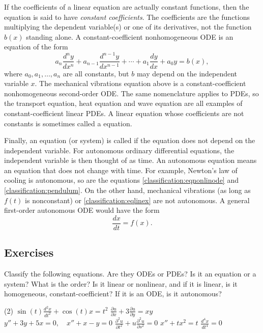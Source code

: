\medskip

If the coefficients of a linear equation are actually constant functions,
then the equation is said to have
\emph{constant coefficients}.
The coefficients are the functions multiplying the dependent
variable(s) or one of its derivatives, not the function $b(x)$ standing alone.
A constant-coefficient nonhomogeneous ODE is an equation of the form
\begin{equation*}
a_n \frac{d^n y}{dx^n} + 
a_{n-1} \frac{d^{n-1} y}{dx^{n-1}} + 
\cdots
+
a_{1} \frac{dy}{dx}
+
a_{0} y = b(x) ,
\end{equation*}
where $a_0, a_1, \ldots, a_n$ are all constants,
but $b$ may depend on 
the independent variable $x$.
The mechanical vibrations equation
above is a constant-coefficient nonhomogeneous second-order ODE\@.
The same nomenclature applies to PDEs, so the transport equation,
heat equation and wave equation are all examples of
constant-coefficient linear PDEs.
A linear equation whose coefficients are not constants is sometimes
called a \emph{} equation.

\medskip

Finally, an equation (or system) is called \emph{}
if the equation does not depend on the independent variable.
For autonomous ordinary differential equations, the
independent variable is then thought of as time.
An autonomous equation
means an equation that does not change with time.
For example, Newton's law of cooling is autonomous, so are the equations
\eqref{classification:eqnonlinode} and
\eqref{classification:pendulum}.  On the other hand, mechanical
vibrations (as long as $f(t)$ is nonconstant) or 
\eqref{classification:eqlinex} are not autonomous.
A general
first-order autonomous ODE would have the form
\begin{equation*}
\frac{dx}{dt} = f(x) .
\end{equation*}

\pagebreak[3]
\subsection{Exercises}

\begin{exercise}
Classify the following equations.  Are they ODEs or PDEs?  Is it an equation
or a system?  What is the order?  Is it linear or nonlinear, and if it is
linear, is it homogeneous, constant-coefficient?  If it is an ODE\@, is it
autonomous?
\begin{tasks}(2)
\task $\displaystyle \sin(t) \frac{d^2 x}{dt^2} + \cos(t) x = t^2$
\task $\displaystyle \frac{\partial u}{\partial x} + 3 \frac{\partial u}{\partial y} = xy$
\task $\displaystyle y''+3y+5x=0, \quad x''+x-y=0$
\task $\displaystyle \frac{\partial^2 u}{\partial t^2} + u\frac{\partial^2 u}{\partial s^2} =
0$
\task $\displaystyle x''+tx^2=t$
\task $\displaystyle \frac{d^4 x}{dt^4} = 0$
\end{tasks}
\end{exercise}

